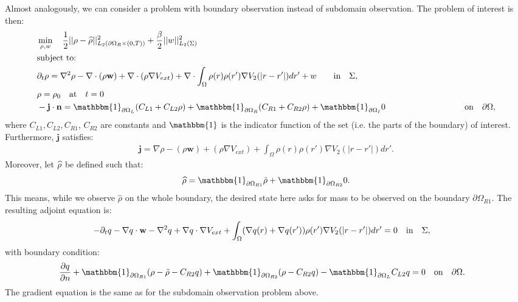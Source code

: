
Almost analogously, we can consider a problem with boundary observation instead of subdomain observation.
The problem of interest is then:
\begin{align*}
&\min_{\Sta, w} \quad \frac{1}{2}|| \Sta -\widehat \Sta||^2_{L_2(\partial \Omega_R \times (0,T))} + \frac{\beta}{2}||w||^2_{L_2(\Sigma)}\\
&\text{subject to:}\\
&\partial_t \rho = \nabla^2 \rho - \nabla \cdot (\rho \mathbf{w}) +\nabla \cdot (\rho \nabla V_{ext}) + \nabla \cdot \int_\Omega \rho(r) \rho(r') \nabla V_2(|r-r'|) dr' + w \quad  \quad\text{in} \quad \Sigma,\notag\\
& \rho = \rho_0 \quad \text{at} \quad t=0 \notag\\
& - \mathbf{j} \cdot \nor = \mathbbm{1}_{\partial \Omega_L}( C_{L1}  + C_{L2}\Sta) +\mathbbm{1}_{\partial \Omega_R} ( C_{R1}  + C_{R2}\Sta) +\mathbbm{1}_{\partial \Omega_I} 0 \ \quad \qquad \qquad \qquad \quad \quad\text{on} \quad \partial \Omega, 
\end{align*}
where $C_{L1}, C_{L2}, C_{R1}$, $C_{R2}$ are constants and $\mathbbm{1}$ is the indicator function of the set (i.e. the parts of the boundary) of interest.
Furthermore, $\mathbf{j}$ satisfies:
\begin{align*}
\mathbf{j}=\nabla \rho - (\rho \mathbf{w}) +(\rho \nabla V_{ext}) +  \int_\Omega \rho(r) \rho(r') \nabla V_2(|r-r'|) dr'.
\end{align*}
Moreover, let $\widehat {\rho}$ be defined such that:
\begin{align*}
\widehat \Sta = \mathbbm{1}_{\partial \Omega_{R1}} \tilde \Sta  +\mathbbm{1}_{\partial \Omega_{R2}} 0.
\end{align*}
This means, while we observe $\widehat \rho$ on the whole boundary, the desired state here asks for mass to be observed on the boundary $\partial \Omega_{R1}$.
The resulting adjoint equation is:
\begin{align*}
- \partial_t  q  - \nabla q \cdot \mathbf{w} - \nabla^2 q \notag 
+  \nabla q \cdot \nabla V_{ext}  \notag 
+ \int_\Omega (\nabla  q(r)+\nabla  q(r')) \rho(r') \nabla V_2(|r-r'|) dr' &=0 \quad \text{in} \quad \Sigma, 
\end{align*}
with boundary condition:
\begin{align*}
\frac{\partial \Adjb }{\partial n}+ \mathbbm{1}_{\partial \Omega_{R1}}(\rho- \tilde{\rho} -C_{R2} \Adjb) + \mathbbm{1}_{\partial \Omega_{R2}} (\Sta-C_{R2} \Adjb) - \mathbbm{1}_{\partial \Omega_L} C_{L2} \Adjb   &=0 \quad \text{on} \quad \partial \Omega.
\end{align*}
The gradient equation is the same as for the subdomain observation problem above.
